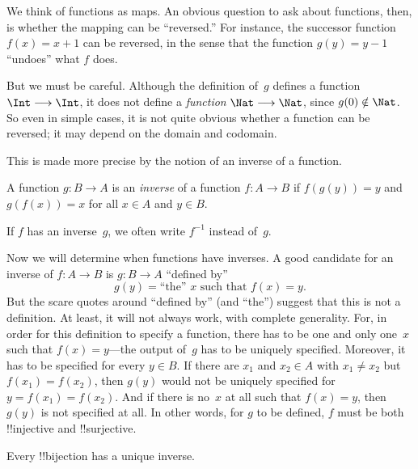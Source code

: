 \documentclass[../../../include/open-logic-section]{subfiles}
\begin{document}

\begin{explain}
We think of functions as maps. An obvious question to ask about
functions, then, is whether the mapping can be ``reversed.'' For
instance, the successor function $f(x) = x + 1$ can be reversed, in
the sense that the function $g(y) = y - 1$ ``undoes'' what $f$ does. 

But we must be careful. Although the definition of~$g$ defines a
function $\Int \to \Int$, it does not define a \emph{function} $\Nat
\to \Nat$, since $g(0) \notin \Nat$.  So even in simple cases, it is
not quite obvious whether a function can be reversed; it may depend on
the domain and codomain.

This is made more precise by the notion of an inverse of a function.
\end{explain}

\begin{defn}
A function $g \colon B \to A$ is an \emph{inverse} of a function $f
\colon A \to B$ if $f(g(y)) = y$ and $g(f(x)) = x$ for all $x \in A$
and $y \in B$.
\end{defn}

If $f$ has an inverse~$g$, we often write $f^{-1}$ instead of~$g$.

\begin{explain}
Now we will determine when functions have inverses. A good candidate
for an inverse of $f\colon A \to B$ is $g\colon B \to A$ ``defined
by''
\[
g(y) = \text{``the'' $x$ such that $f(x) = y$.}
\]
But the scare quotes around ``defined by'' (and ``the'') suggest that
this is not a definition.  At least, it will not always work, with
complete generality. For, in order for this definition to specify a
function, there has to be one and only one~$x$ such that $f(x) =
y$---the output of~$g$ has to be uniquely specified. Moreover, it has
to be specified for every $y \in B$.  If there are $x_1$ and $x_2 \in
A$ with $x_1 \neq x_2$ but $f(x_1) = f(x_2)$, then $g(y)$ would not be
uniquely specified for $y = f(x_1) = f(x_2)$. And if there is no~$x$
at all such that $f(x) = y$, then $g(y)$ is not specified at all.  In
other words, for $g$ to be defined, $f$ must be both !!{injective} and
!!{surjective}.
\end{explain}

\begin{prop}
Every !!{bijection} has a unique inverse.
\end{prop}
\end{document}

